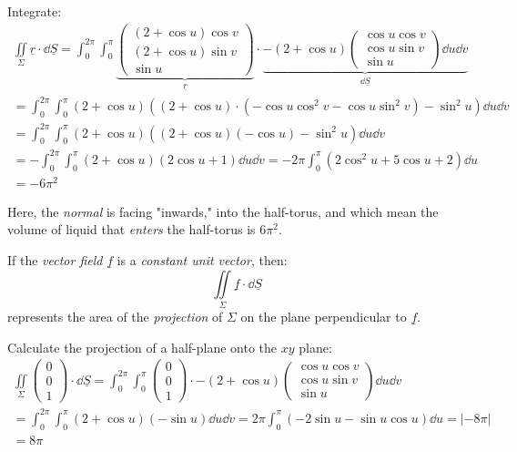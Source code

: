 \documentclass[00_complete]{sub files}
\begin{document}
\begin{example}
    Integrate:
    \begin{gather*}
    \iint\limits_\Sigma \underline r \cdot \dd{\underline
    S}=\int_{0}^{2\pi}\int_{0}^{\pi}
    \underbrace{
    \begin{pmatrix}
        (2+\cos u) \cos v \\ (2+\cos u) \sin v \\ \sin u
    \end{pmatrix}}_{\underline r} \cdot \underbrace{-(2+\cos u)\begin{pmatrix}
        \cos u \cos v \\ \cos u \sin v \\ \sin u
    \end{pmatrix} \dd{u}\dd{v}}_{\dd{\underline S}} \\
    =\int_{0}^{2\pi}\int_{0}^{\pi}(2+\cos u)((2+\cos u)\cdot (-\cos u
    \cos^2v-\cos u \sin^2 v)-\sin^2 u) \dd{u}\dd{v} \\
    =\int_{0}^{2\pi}\int_{0}^{\pi}(2+\cos u)((2+\cos u)(-\cos u)-\sin^2
    u)\dd{u} \dd{v} \\
    =-\int_{0}^{2\pi}\int_{0}^{\pi}(2+\cos u)(2\cos u +1)
    \dd{u}\dd{v}=-2\pi\int_{0}^{\pi}(2\cos^2u +5\cos u + 2)\dd{u} \\
    =-6\pi^2
    \end{gather*}
\begin{note}
    Here, the \emph{normal} is facing "inwards," into the
    half-torus, and which mean the volume of liquid that
    \emph{enters} the half-torus is $6\pi^2$.
\end{note}
\end{example}
\begin{note}
    If the \emph{vector field} $\underline f$ is a \emph{constant unit vector},
    then:
    $$\iint\limits_\Sigma \underline f \cdot \dd{\underline S}$$
    represents the area of the \emph{projection} of $\Sigma$ on the plane
    perpendicular to $\underline f$.
\end{note}
\begin{example}
    Calculate the projection of a half-plane onto the $xy$ plane:
    \begin{gather*}
    \iint\limits_\Sigma\begin{pmatrix}
        0 \\ 0 \\ 1
    \end{pmatrix} \cdot \dd{\underline S} = \int_{0}^{2\pi}\int_{0}^{\pi} \begin{pmatrix}
        0 \\ 0 \\ 1
    \end{pmatrix} \cdot -(2+\cos u)\begin{pmatrix}
        \cos u \cos v \\ \cos u \sin v \\ \sin u
    \end{pmatrix} \dd{u}\dd{v} \\
    =\int_{0}^{2\pi}\int_{0}^{\pi}(2+\cos u)(-\sin u)\dd{u}\dd{v} =
    2\pi\int_{0}^{\pi} (-2\sin u -\sin u \cos u)\dd{u} = |-8\pi| \\=8\pi
    \end{gather*}
\end{example}
\end{document}
